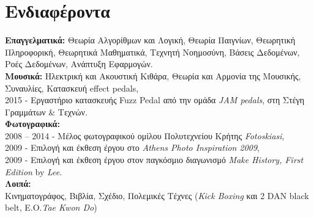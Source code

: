 \documentclass[print]{keros-cv} %
\begin{document}
\section{Ενδιαφέροντα}

\textbf{Επαγγελματικά:}
 Θεωρία Αλγορίθμων και Λογική,
 Θεωρία Παιγνίων,
 Θεωρητική Πληροφορική,
 Θεωρητικά Μαθηματικά,
 Τεχνητή Νοημοσύνη,
 Βάσεις Δεδομένων,
 Ροές Δεδομένων, 
 Ανάπτυξη Εφαρμογών.\\
\textbf{Μουσικά:}
 Ηλεκτρική και Ακουστική Κιθάρα,
 Θεωρία και Αρμονία της Μουσικής,
 Συναυλίες,
 Κατασκευή effect pedals,\\
 2015 - Εργαστήριο κατασκευής Fuzz Pedal από την ομάδα \textit{JAM pedals}, στη Στέγη Γραμμάτων \& Τεχνών.\\
 \textbf{Φωτογραφικά:}\\
 2008 -- 2014 - Μέλος φωτογραφικού ομίλου Πολυτεχνείου Κρήτης \textit{Fotoskiasi}, \\
 2009 - Επιλογή και έκθεση έργου στο \textit{Athens Photo Inspiration 2009},\\
 2009 - Επιλογή και έκθεση έργου στον παγκόσμιο διαγωνισμό \textit{Make History, First Edition} by \emph{Lee}.\\
\textbf{Λοιπά:}\\
 Κινηματογράφος, 
 Βιβλία, 
 Σχέδιο, 
 Πολεμικές Τέχνες (\textit{Kick Boxing} και 2 DAN black belt, Ε.Ο.\textit{Tae Kwon Do}) 

%
%
%
%
%
%
%

\end{document}
